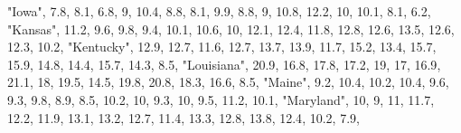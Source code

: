 \documentclass[
]{book}
\newenvironment{Shaded}{\begin{snugshade}}{\end{snugshade}}
\newcommand{\DecValTok}[1]{\textcolor[rgb]{0.00,0.00,0.81}{#1}}
\newcommand{\FloatTok}[1]{\textcolor[rgb]{0.00,0.00,0.81}{#1}}
\newcommand{\NormalTok}[1]{#1}
\newcommand{\StringTok}[1]{\textcolor[rgb]{0.31,0.60,0.02}{#1}}
\begin{document}
\begin{Shaded}
\begin{Highlighting}[]
                  \StringTok{"Iowa"}\NormalTok{,  }\FloatTok{7.8}\NormalTok{,  }\FloatTok{8.1}\NormalTok{,  }\FloatTok{6.8}\NormalTok{,    }\DecValTok{9}\NormalTok{, }\FloatTok{10.4}\NormalTok{,  }\FloatTok{8.8}\NormalTok{,  }\FloatTok{8.1}\NormalTok{,  }\FloatTok{9.9}\NormalTok{,  }\FloatTok{8.8}\NormalTok{,    }\DecValTok{9}\NormalTok{, }\FloatTok{10.8}\NormalTok{, }\FloatTok{12.2}\NormalTok{,   }\DecValTok{10}\NormalTok{, }\FloatTok{10.1}\NormalTok{,  }\FloatTok{8.1}\NormalTok{,  }\FloatTok{6.2}\NormalTok{,}
                \StringTok{"Kansas"}\NormalTok{, }\FloatTok{11.2}\NormalTok{,  }\FloatTok{9.6}\NormalTok{,  }\FloatTok{9.8}\NormalTok{,  }\FloatTok{9.4}\NormalTok{, }\FloatTok{10.1}\NormalTok{, }\FloatTok{10.6}\NormalTok{,   }\DecValTok{10}\NormalTok{, }\FloatTok{12.1}\NormalTok{, }\FloatTok{12.4}\NormalTok{, }\FloatTok{11.8}\NormalTok{, }\FloatTok{12.8}\NormalTok{, }\FloatTok{12.6}\NormalTok{, }\FloatTok{13.5}\NormalTok{, }\FloatTok{12.6}\NormalTok{, }\FloatTok{12.3}\NormalTok{, }\FloatTok{10.2}\NormalTok{,}
              \StringTok{"Kentucky"}\NormalTok{, }\FloatTok{12.9}\NormalTok{, }\FloatTok{12.7}\NormalTok{, }\FloatTok{11.6}\NormalTok{, }\FloatTok{12.7}\NormalTok{, }\FloatTok{13.7}\NormalTok{, }\FloatTok{13.9}\NormalTok{, }\FloatTok{11.7}\NormalTok{, }\FloatTok{15.2}\NormalTok{, }\FloatTok{13.4}\NormalTok{, }\FloatTok{15.7}\NormalTok{, }\FloatTok{15.9}\NormalTok{, }\FloatTok{14.8}\NormalTok{, }\FloatTok{14.4}\NormalTok{, }\FloatTok{15.7}\NormalTok{, }\FloatTok{14.3}\NormalTok{,  }\FloatTok{8.5}\NormalTok{,}
             \StringTok{"Louisiana"}\NormalTok{, }\FloatTok{20.9}\NormalTok{, }\FloatTok{16.8}\NormalTok{, }\FloatTok{17.8}\NormalTok{, }\FloatTok{17.2}\NormalTok{,   }\DecValTok{19}\NormalTok{,   }\DecValTok{17}\NormalTok{, }\FloatTok{16.9}\NormalTok{, }\FloatTok{21.1}\NormalTok{,   }\DecValTok{18}\NormalTok{, }\FloatTok{19.5}\NormalTok{, }\FloatTok{14.5}\NormalTok{, }\FloatTok{19.8}\NormalTok{, }\FloatTok{20.8}\NormalTok{, }\FloatTok{18.3}\NormalTok{, }\FloatTok{16.6}\NormalTok{,  }\FloatTok{8.5}\NormalTok{,}
                 \StringTok{"Maine"}\NormalTok{,  }\FloatTok{9.2}\NormalTok{, }\FloatTok{10.4}\NormalTok{, }\FloatTok{10.2}\NormalTok{, }\FloatTok{10.4}\NormalTok{,  }\FloatTok{9.6}\NormalTok{,  }\FloatTok{9.3}\NormalTok{,  }\FloatTok{9.8}\NormalTok{,  }\FloatTok{8.9}\NormalTok{,  }\FloatTok{8.5}\NormalTok{, }\FloatTok{10.2}\NormalTok{,   }\DecValTok{10}\NormalTok{,  }\FloatTok{9.3}\NormalTok{,   }\DecValTok{10}\NormalTok{,  }\FloatTok{9.5}\NormalTok{, }\FloatTok{11.2}\NormalTok{, }\FloatTok{10.1}\NormalTok{,}
              \StringTok{"Maryland"}\NormalTok{,   }\DecValTok{10}\NormalTok{,    }\DecValTok{9}\NormalTok{,   }\DecValTok{11}\NormalTok{, }\FloatTok{11.7}\NormalTok{, }\FloatTok{12.2}\NormalTok{, }\FloatTok{11.9}\NormalTok{, }\FloatTok{13.1}\NormalTok{, }\FloatTok{13.2}\NormalTok{, }\FloatTok{12.7}\NormalTok{, }\FloatTok{11.4}\NormalTok{, }\FloatTok{13.3}\NormalTok{, }\FloatTok{12.8}\NormalTok{, }\FloatTok{13.8}\NormalTok{, }\FloatTok{12.4}\NormalTok{, }\FloatTok{10.2}\NormalTok{,  }\FloatTok{7.9}\NormalTok{,}

\end{Highlighting}
\end{Shaded}
\end{document}

